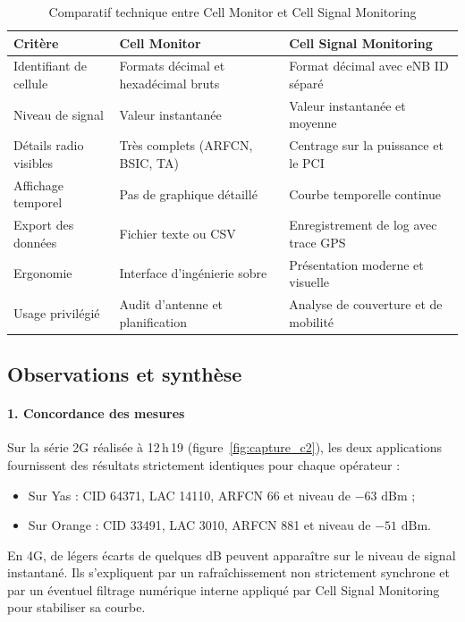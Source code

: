 \documentclass[11pt,a4paper]{article}
\begin{document}
\begin{table}[H]
\centering
\caption{Comparatif technique entre Cell Monitor et Cell Signal Monitoring}
\label{tab:comparatif_applis}
\small
\begin{tabular}{p{4.5cm} p{5.2cm} p{5.2cm}}
\toprule
\textbf{Crit\`ere} & \textbf{Cell Monitor} & \textbf{Cell Signal Monitoring} \\
\midrule
Identifiant de cellule & Formats d\'ecimal et hexad\'ecimal bruts & Format d\'ecimal avec eNB ID s\'epar\'e \\
Niveau de signal & Valeur instantan\'ee & Valeur instantan\'ee et moyenne \\
D\'etails radio visibles & Tr\`es complets (ARFCN, BSIC, TA) & Centrage sur la puissance et le PCI \\
Affichage temporel & Pas de graphique d\'etaill\'e & Courbe temporelle continue \\
Export des donn\'ees & Fichier texte ou CSV & Enregistrement de log avec trace GPS \\
Ergonomie & Interface d'ing\'enierie sobre & Pr\'esentation moderne et visuelle \\
Usage privil\'egi\'e & Audit d'antenne et planification & Analyse de couverture et de mobilit\'e \\
\bottomrule
\end{tabular}
\end{table}

\subsection{Observations et synth\`ese}

\paragraph{1. Concordance des mesures}
Sur la s\'erie 2G r\'ealis\'ee \`a 12\,h\,19 (figure~\ref{fig:capture_c2}), les deux applications fournissent des r\'esultats strictement identiques pour chaque op\'erateur :
\begin{itemize}
    \item Sur Yas : CID 64371, LAC 14110, ARFCN 66 et niveau de $-63\text{ dBm}$ ;
    \item Sur Orange : CID 33491, LAC 3010, ARFCN 881 et niveau de $-51\text{ dBm}$.
\end{itemize}
En 4G, de l\'egers \'ecarts de quelques dB peuvent appara\^itre sur le niveau de signal instantan\'e. Ils s'expliquent par un rafra\^ichissement non strictement synchrone et par un \'eventuel filtrage num\'erique interne appliqu\'e par Cell Signal Monitoring pour stabiliser sa courbe.
\end{document}

